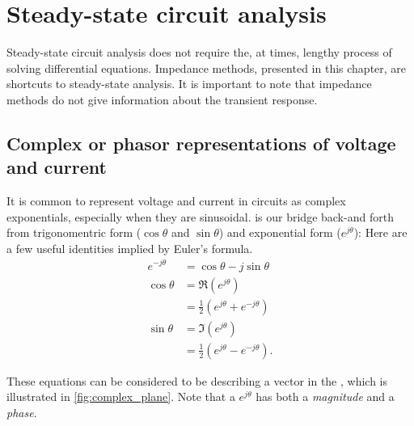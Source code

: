 \documentclass[electronics.tex]{subfiles}
\begin{document}
\chapter{Steady-state circuit analysis}
\tags{}
\label{ch:steady_state}

Steady-state circuit analysis does not require the, at times, lengthy process of solving differential equations.
Impedance methods, presented in this chapter, are shortcuts to steady-state analysis.
It is important to note that impedance methods do not give information about the transient response.
\tags{}

\section[Phasor voltage and current]{Complex or phasor representations of voltage and current}
\tags{}

It is common to represent voltage and current in circuits as complex exponentials, especially when they are sinusoidal.
 is our bridge back-and forth from trigonomentric form ($\cos\theta$ and $\sin\theta$) and exponential form ($e^{j\theta}$):
\tags{}
Here are a few useful identities implied by Euler's formula.
\begin{subequations}
\begin{align}
	e^{-j\theta} &= \cos\theta - j\sin\theta \\
	\cos\theta &= \Re{(e^{j\theta})} \\
	&= \frac{1}{2}\left(e^{j\theta}+e^{-j\theta}\right) \\
	\sin\theta &= \Im{(e^{j\theta})} \\
	&= \frac{1}{2}\left(e^{j\theta}-e^{-j\theta}\right).
\end{align}
\end{subequations}

These equations can be considered to be describing a vector in the , which is illustrated in \autoref{fig:complex_plane}.
Note that a $e^{j\theta}$ has both a \emph{magnitude} and a \emph{phase}.
\tags{}
\end{document}
